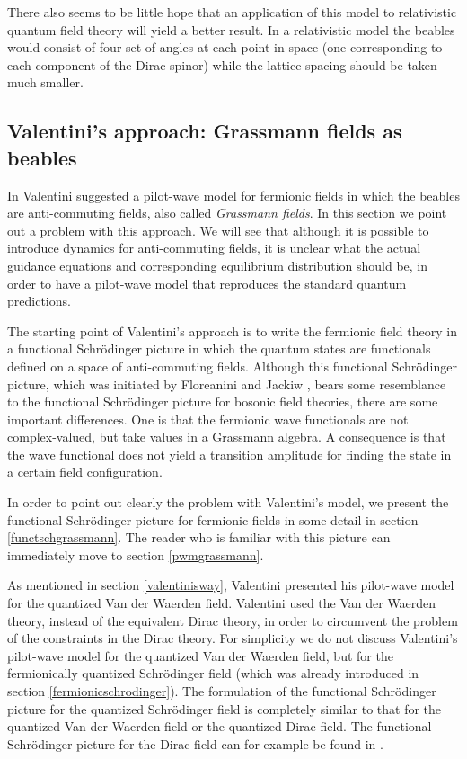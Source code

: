\documentclass[12pt]{article}
\begin{document}
There also seems to be little hope that an application of this model to relativistic quantum field theory will yield a better result. In a relativistic model the beables would consist of four set of angles at each point in space (one corresponding to each component of the Dirac spinor) while the lattice spacing should be taken much smaller. 





\subsection{Valentini's approach: Grassmann fields as beables}\label{valentinismodelfermions}
In \cite{valentini92,valentini96} Valentini suggested a pilot-wave model for fermionic fields in which the beables are anti-commuting fields, also called {\em Grassmann fields}. In this section we point out a problem with this approach. We will see that although it is possible to introduce dynamics for anti-commuting fields, it is unclear what the actual guidance equations and corresponding equilibrium distribution should be, in order to have a pilot-wave model that reproduces the standard quantum predictions.

The starting point of Valentini's approach is to write the fermionic field theory in a functional Schr{\"o}\-ding\-er picture in which the quantum states are functionals defined on a space of anti-commuting fields. Although this functional Schr{\"o}\-ding\-er picture, which was initiated by Floreanini and Jackiw \cite{floreanini88}, bears some resemblance to the functional Schr{\"o}\-ding\-er picture for bosonic field theories, there are some important differences. One is that the fermionic wave functionals are not complex-valued, but take values in a Grassmann algebra. A consequence is that the wave functional does not yield a transition amplitude for finding the state in a certain field configuration. 

In order to point out clearly the problem with Valentini's model, we present the functional Schr{\"o}\-ding\-er picture for fermionic fields in some detail in section \ref{functschgrassmann}. The reader who is familiar with this picture can immediately move to section \ref{pwmgrassmann}. 

As mentioned in section \ref{valentinisway}, Valentini presented his pilot-wave model for the quantized Van der Waerden field. Valentini used the Van der Waerden theory, instead of the equivalent Dirac theory, in order to circumvent the problem of the constraints in the Dirac theory. For simplicity we do not discuss Valentini's pilot-wave model for the quantized Van der Waerden field, but for the fermionically quantized Schr{\"o}\-ding\-er field (which was already introduced in section \ref{fermionicschrodinger}). The formulation of the functional Schr{\"o}\-ding\-er picture for the quantized Schr{\"o}\-ding\-er field is completely similar to that for the quantized Van der Waerden field or the quantized Dirac field. The functional Schr{\"o}\-ding\-er picture for the Dirac field can for example be found in \cite{kiefer94}.
\end{document}
